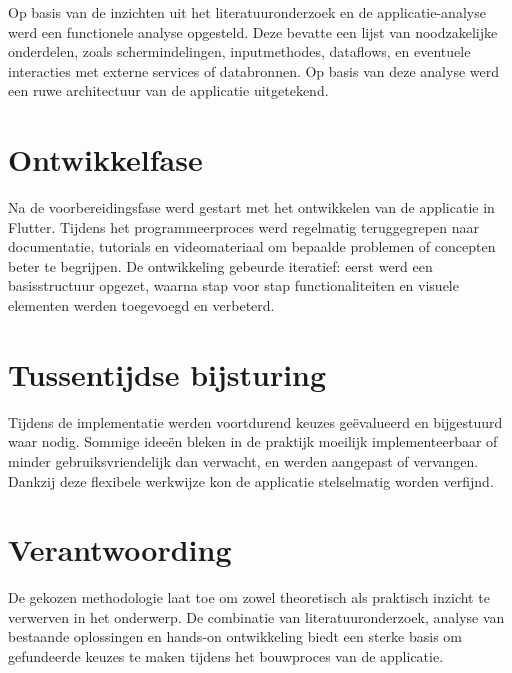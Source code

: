 Op basis van de inzichten uit het literatuuronderzoek en de applicatie-analyse werd een functionele analyse opgesteld. Deze bevatte een lijst van noodzakelijke onderdelen, zoals schermindelingen, inputmethodes, dataflows, en eventuele interacties met externe services of databronnen. Op basis van deze analyse werd een ruwe architectuur van de applicatie uitgetekend.

\section{Ontwikkelfase}

Na de voorbereidingsfase werd gestart met het ontwikkelen van de applicatie in Flutter. Tijdens het programmeerproces werd regelmatig teruggegrepen naar documentatie, tutorials en videomateriaal om bepaalde problemen of concepten beter te begrijpen. De ontwikkeling gebeurde iteratief: eerst werd een basisstructuur opgezet, waarna stap voor stap functionaliteiten en visuele elementen werden toegevoegd en verbeterd.

\section{Tussentijdse bijsturing}

Tijdens de implementatie werden voortdurend keuzes geëvalueerd en bijgestuurd waar nodig. Sommige ideeën bleken in de praktijk moeilijk implementeerbaar of minder gebruiksvriendelijk dan verwacht, en werden aangepast of vervangen. Dankzij deze flexibele werkwijze kon de applicatie stelselmatig worden verfijnd.

\section{Verantwoording}

De gekozen methodologie laat toe om zowel theoretisch als praktisch inzicht te verwerven in het onderwerp. De combinatie van literatuuronderzoek, analyse van bestaande oplossingen en hands-on ontwikkeling biedt een sterke basis om gefundeerde keuzes te maken tijdens het bouwproces van de applicatie.




